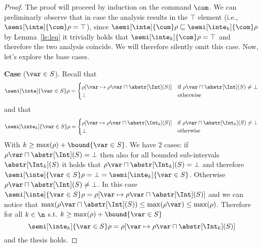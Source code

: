 \begin{proof}

  The proof will proceed by induction on the command \(\com\). We can
  preliminarly observe that in case the analysis results in the
  \(\top\) element (i.e., \({\semi[\inte]{\com}\rho = \top}\)),  since
  \(\semi[\inte]{\com}\rho \sqsubseteq \semi[\inte_k]{\com}\rho\) by
  Lemma~\ref{le:leq} it trivially holds that
  \(\semi[\inte_k]{\com}\rho = \top\) and therefore the two analysis
  coincide. We will therefore silently omit this case.  Now, let's
  explore the base cases.

  \medskip
  
  \noindent
  \textbf{Case} (\(\var \in S\)).
  Recall that
  \begin{equation*}
    \semi[\inte]{\var \in S}\rho = \begin{cases}
      \rho[\var \mapsto \rho\var \sqcap \abstr[\Int](S)] & \text{if } \rho\var \sqcap \abstr[\Int](S) \neq \bot \\
      \bot & \text{otherwise}
    \end{cases}
  \end{equation*}
  and that
  \begin{equation*}
    \semi[\inte_k]{\var \in S}\rho = \begin{cases}
      \rho[\var \mapsto \rho\var \sqcap \abstr[\Int_k](S)] & \text{if } \rho\var \sqcap \abstr[\Int_k](S) \neq \bot \\
      \bot & \text{otherwise}
    \end{cases}
  \end{equation*}
  With \(k \geq \max(\rho) + \bound{\var \in S}\). We have 2 cases: if
  \({\rho\var \sqcap \abstr[\Int](S) = \bot}\) then also for all
  bounded sub-intervals \(\abstr[\Int_k](S)\) it holds that
  \({\rho\var \sqcap \abstr[\Int_k](S) = \bot}\) and therefore
  \({\semi[\inte]{\var\in S}\rho = \bot = \semi[\inte_k]{\var \in
      S}}\). Otherwise
  \({\rho\var \sqcap \abstr[\Int](S) \neq \bot}\). In this case
  \({\semi[\inte]{\var \in S}\rho = \rho[\var \mapsto \rho\var \sqcap
    \abstr[\Int](S)]}\) and we can notice that
  \(\max(\rho\var \sqcap \abstr[\Int](S)) \leq
  \max(\rho\var) \leq \max(\rho)\). Therefore for all \(k\in\n\) s.t.
  \({k\geq \max(\rho) + \bound{\var\in S}}\)
  \begin{equation*}
    \semi[\inte_k]{\var \in S}\rho = \rho[\var \mapsto \rho\var \sqcap \abstr[\Int_k](S)]
  \end{equation*}
  and the thesis holds.


\end{proof}
